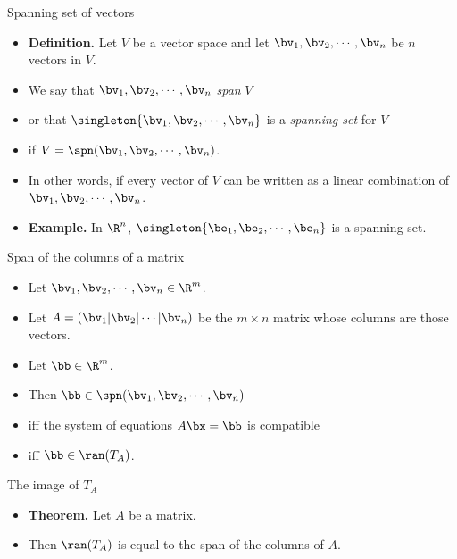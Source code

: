 \documentclass{beamer}
\begin{document}
\begin{frame}{Spanning set of vectors}

\begin{itemize}
\item \textbf{Definition.} Let $V$ be a vector space and let $\bv_1,\bv_2,\cdots,\bv_n$ be $n$ vectors in $V$.
\item We say that $\bv_1,\bv_2,\cdots,\bv_n$ \emph{span} $V$
\item or that $\singleton{\bv_1,\bv_2,\cdots,\bv_n}$ is a \emph{spanning set} for $V$
\item if $V=\spn(\bv_1,\bv_2,\cdots,\bv_n)$.
\item In other words, if every vector of $V$ can be written as a linear combination of
 $\bv_1,\bv_2,\cdots,\bv_n$.
 \item \textbf{Example.} In $\R^n$, $\singleton{\be_1,\be_2,\cdots,\be_n}$ is a
 spanning set.
\end{itemize}

\end{frame}


\begin{frame}{Span of the columns of a matrix}

\begin{itemize}
\item Let $\bv_1,\bv_2,\cdots,\bv_n \in \R^m$.
\item Let $A =\left( \bv_1 \vert \bv_2 \vert \cdots \vert \bv_n \right)$
be the $m\times n$ matrix whose columns are those vectors.
\item Let $\bb\in\R^m$.
\item Then $\bb\in\spn(\bv_1,\bv_2,\cdots,\bv_n)$
\item iff the system of equations $A\bx=\bb$ is compatible
\item iff $\bb\in\ran(T_A)$.
\end{itemize}

\end{frame}


\begin{frame}{The image of $T_A$}

\begin{itemize}
\item \textbf{Theorem.} Let $A$ be a matrix.
\item Then $\ran(T_A)$ is equal to the span of the columns of $A$.
\end{itemize}

\end{frame}
\end{document}
